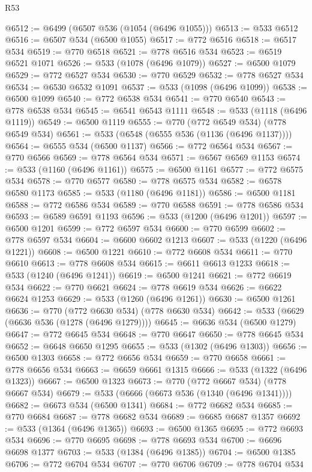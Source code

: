 \begin{lexlean}{R53}
\begin{coremodule}
@6512 := @6499 (@6507 @536 (@1054 (@6496 @1055)))
@6513 := @533 @6512
@6516 := @6507 @534 (@6500 @1055)
@6517 := @772 @6516
@6518 := @6517 @534
@6519 := @770 @6518
@6521 := @778 @6516 @534
@6523 := @6519 @6521 @1071
@6526 := @533 (@1078 (@6496 @1079))
@6527 := @6500 @1079
@6529 := @772 @6527 @534
@6530 := @770 @6529
@6532 := @778 @6527 @534
@6534 := @6530 @6532 @1091
@6537 := @533 (@1098 (@6496 @1099))
@6538 := @6500 @1099
@6540 := @772 @6538 @534
@6541 := @770 @6540
@6543 := @778 @6538 @534
@6545 := @6541 @6543 @1111
@6548 := @533 (@1118 (@6496 @1119))
@6549 := @6500 @1119
@6555 := @770 (@772 @6549 @534) (@778 @6549 @534)
@6561 := @533 (@6548 (@6555 @536 (@1136 (@6496 @1137))))
@6564 := @6555 @534 (@6500 @1137)
@6566 := @772 @6564 @534
@6567 := @770 @6566
@6569 := @778 @6564 @534
@6571 := @6567 @6569 @1153
@6574 := @533 (@1160 (@6496 @1161))
@6575 := @6500 @1161
@6577 := @772 @6575 @534
@6578 := @770 @6577
@6580 := @778 @6575 @534
@6582 := @6578 @6580 @1173
@6585 := @533 (@1180 (@6496 @1181))
@6586 := @6500 @1181
@6588 := @772 @6586 @534
@6589 := @770 @6588
@6591 := @778 @6586 @534
@6593 := @6589 @6591 @1193
@6596 := @533 (@1200 (@6496 @1201))
@6597 := @6500 @1201
@6599 := @772 @6597 @534
@6600 := @770 @6599
@6602 := @778 @6597 @534
@6604 := @6600 @6602 @1213
@6607 := @533 (@1220 (@6496 @1221))
@6608 := @6500 @1221
@6610 := @772 @6608 @534
@6611 := @770 @6610
@6613 := @778 @6608 @534
@6615 := @6611 @6613 @1233
@6618 := @533 (@1240 (@6496 @1241))
@6619 := @6500 @1241
@6621 := @772 @6619 @534
@6622 := @770 @6621
@6624 := @778 @6619 @534
@6626 := @6622 @6624 @1253
@6629 := @533 (@1260 (@6496 @1261))
@6630 := @6500 @1261
@6636 := @770 (@772 @6630 @534) (@778 @6630 @534)
@6642 := @533 (@6629 (@6636 @536 (@1278 (@6496 @1279))))
@6645 := @6636 @534 (@6500 @1279)
@6647 := @772 @6645 @534
@6648 := @770 @6647
@6650 := @778 @6645 @534
@6652 := @6648 @6650 @1295
@6655 := @533 (@1302 (@6496 @1303))
@6656 := @6500 @1303
@6658 := @772 @6656 @534
@6659 := @770 @6658
@6661 := @778 @6656 @534
@6663 := @6659 @6661 @1315
@6666 := @533 (@1322 (@6496 @1323))
@6667 := @6500 @1323
@6673 := @770 (@772 @6667 @534) (@778 @6667 @534)
@6679 := @533 (@6666 (@6673 @536 (@1340 (@6496 @1341))))
@6682 := @6673 @534 (@6500 @1341)
@6684 := @772 @6682 @534
@6685 := @770 @6684
@6687 := @778 @6682 @534
@6689 := @6685 @6687 @1357
@6692 := @533 (@1364 (@6496 @1365))
@6693 := @6500 @1365
@6695 := @772 @6693 @534
@6696 := @770 @6695
@6698 := @778 @6693 @534
@6700 := @6696 @6698 @1377
@6703 := @533 (@1384 (@6496 @1385))
@6704 := @6500 @1385
@6706 := @772 @6704 @534
@6707 := @770 @6706
@6709 := @778 @6704 @534

\end{coremodule}
\end{lexlean}
